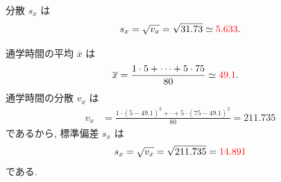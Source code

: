 \begin{qenumerate}
{\begin{enumerate}
{				分散 $s_{x}$ は
				\begin{align}
					s_{x} = \sqrt{v_{x}} = \sqrt{31.73} \simeq \textcolor{red}{5.633}.
				\end{align}
			}
		\end{enumerate}
	}
	\item{
		通学時間の平均 $\overline{x}$ は
		\begin{align}
			\overline{x} &= \frac{1\cdot 5 + \cdots + 5\cdot 75}{80} \simeq \textcolor{red}{49.1}.
		\end{align}
		通学時間の分散 $v_{x}$ は
		\begin{align}
			v_{x} &= \frac{1\cdot (5 - 49.1)^{2} + \cdot + 5\cdot (75 - 49.1)^{2}}{80} = 211.735
		\end{align}
		であるから, 標準偏差 $s_{x}$ は
		\begin{align}
			s_{x} = \sqrt{v_{x}} = \sqrt{211.735} = \textcolor{red}{14.891}
		\end{align}
		である.
	}
\end{qenumerate}

